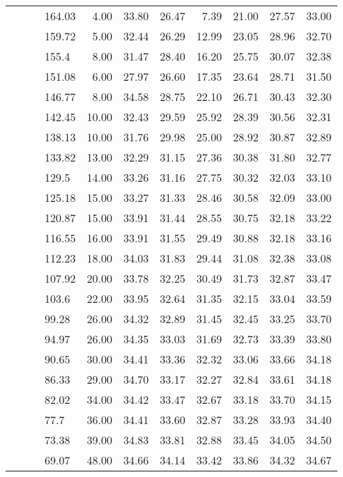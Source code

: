 \begin{longtable}{llllrrrrrrr}
   &  &  & 164.03 & 4.00 & 33.80 & 26.47 & 7.39 & 21.00 & 27.57 & 33.00 \\ 
   &  &  & 159.72 & 5.00 & 32.44 & 26.29 & 12.99 & 23.05 & 28.96 & 32.70 \\ 
   &  &  & 155.4 & 8.00 & 31.47 & 28.40 & 16.20 & 25.75 & 30.07 & 32.38 \\ 
   &  &  & 151.08 & 6.00 & 27.97 & 26.60 & 17.35 & 23.64 & 28.71 & 31.50 \\ 
   &  &  & 146.77 & 8.00 & 34.58 & 28.75 & 22.10 & 26.71 & 30.43 & 32.30 \\ 
   &  &  & 142.45 & 10.00 & 32.43 & 29.59 & 25.92 & 28.39 & 30.56 & 32.31 \\ 
   &  &  & 138.13 & 10.00 & 31.76 & 29.98 & 25.00 & 28.92 & 30.87 & 32.89 \\ 
   &  &  & 133.82 & 13.00 & 32.29 & 31.15 & 27.36 & 30.38 & 31.80 & 32.77 \\ 
   &  &  & 129.5 & 14.00 & 33.26 & 31.16 & 27.75 & 30.32 & 32.03 & 33.10 \\ 
   &  &  & 125.18 & 15.00 & 33.27 & 31.33 & 28.46 & 30.58 & 32.09 & 33.00 \\ 
   &  &  & 120.87 & 15.00 & 33.91 & 31.44 & 28.55 & 30.75 & 32.18 & 33.22 \\ 
   &  &  & 116.55 & 16.00 & 33.91 & 31.55 & 29.49 & 30.88 & 32.18 & 33.16 \\ 
   &  &  & 112.23 & 18.00 & 34.03 & 31.83 & 29.44 & 31.08 & 32.38 & 33.08 \\ 
   &  &  & 107.92 & 20.00 & 33.78 & 32.25 & 30.49 & 31.73 & 32.87 & 33.47 \\ 
   &  &  & 103.6 & 22.00 & 33.95 & 32.64 & 31.35 & 32.15 & 33.04 & 33.59 \\ 
   &  &  & 99.28 & 26.00 & 34.32 & 32.89 & 31.45 & 32.45 & 33.25 & 33.70 \\ 
   &  &  & 94.97 & 26.00 & 34.35 & 33.03 & 31.69 & 32.73 & 33.39 & 33.80 \\ 
   &  &  & 90.65 & 30.00 & 34.41 & 33.36 & 32.32 & 33.06 & 33.66 & 34.18 \\ 
   &  &  & 86.33 & 29.00 & 34.70 & 33.17 & 32.27 & 32.84 & 33.61 & 34.18 \\ 
   &  &  & 82.02 & 34.00 & 34.42 & 33.47 & 32.67 & 33.18 & 33.70 & 34.15 \\ 
   &  &  & 77.7 & 36.00 & 34.41 & 33.60 & 32.87 & 33.28 & 33.93 & 34.40 \\ 
   &  &  & 73.38 & 39.00 & 34.83 & 33.81 & 32.88 & 33.45 & 34.05 & 34.50 \\ 
   &  &  & 69.07 & 48.00 & 34.66 & 34.14 & 33.42 & 33.86 & 34.32 & 34.67 \\ 

\end{longtable}
